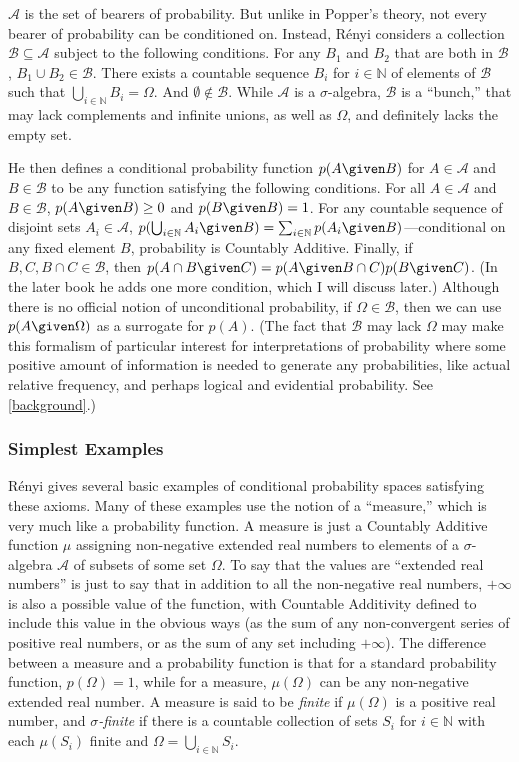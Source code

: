 $\mathcal{A}$ is the set of bearers of probability. But unlike in Popper's theory, not every bearer of probability can be conditioned on. Instead, R\'{e}nyi considers a collection $\mathcal{B}\subseteq\mathcal{A}$ subject to the following conditions. For any $B_1$ and $B_2$ that are both in $\mathcal{B}$, $B_1\cup B_2\in\mathcal{B}$. There exists a countable sequence $B_i$ for $i\in\mathbb{N}$ of elements of $\mathcal{B}$ such that $\bigcup_{i\in\mathbb{N}}B_i=\Omega$. And $\emptyset\not\in\mathcal{B}$. While $\mathcal{A}$ is a $\sigma$-algebra, $\mathcal{B}$ is a ``bunch,'' that may lack complements and infinite unions, as well as $\Omega$, and definitely lacks the empty set.

He then defines a conditional probability function $p(A \given B)$ for $A\in\mathcal{A}$ and $B\in\mathcal{B}$ to be any function satisfying the following conditions. For all $A\in\mathcal{A}$ and $B\in\mathcal{B}$, $p(A \given B)\geq 0$ and $p(B \given B)=1$. For any countable sequence of disjoint sets $A_i\in\mathcal{A}$, $p(\bigcup_{i\in\mathbb{N}}A_i \given B)=\sum_{i\in\mathbb{N}}p(A_i \given B)$---conditional on any fixed element $B$, probability is Countably Additive. Finally, if $B,C,B\cap C\in \mathcal{B}$, then $p(A\cap B \given C)=p(A \given B\cap C)p(B \given C)$. (In the later book he adds one more condition, which I will discuss later.) Although there is no official notion of unconditional probability, if $\Omega\in\mathcal{B}$, then we can use $p(A \given \Omega)$ as a surrogate for $p(A)$. (The fact that $\mathcal{B}$ may lack $\Omega$ may make this formalism of particular interest for interpretations of probability where some positive amount of information is needed to generate any probabilities, like actual relative frequency, and perhaps logical and evidential probability. See \autoref{background}.)

\subsubsection{Simplest Examples}\label{simple}

R\'{e}nyi gives several basic examples of conditional probability spaces satisfying these axioms. Many of these examples use the notion of a ``measure,'' which is very much like a probability function. A measure is just a Countably Additive function $\mu$ assigning non-negative extended real numbers to elements of a $\sigma$-algebra $\mathcal{A}$ of subsets of some set $\Omega$. To say that the values are ``extended real numbers'' is just to say that in addition to all the non-negative real numbers, $+\infty$ is also a possible value of the function, with Countable Additivity defined to include this value in the obvious ways (as the sum of any non-convergent series of positive real numbers, or as the sum of any set including $+\infty$). The difference between a measure and a probability function is that for a standard probability function, $p(\Omega)=1$, while for a measure, $\mu(\Omega)$ can be any non-negative extended real number. A measure is said to be \textit{finite} if $\mu(\Omega)$ is a positive real number, and \textit{$\sigma$-finite} if there is a countable collection of sets $S_i$ for $i\in\mathbb{N}$ with each $\mu(S_i)$ finite and $\Omega=\bigcup_{i\in\mathbb{N}}S_i$.


